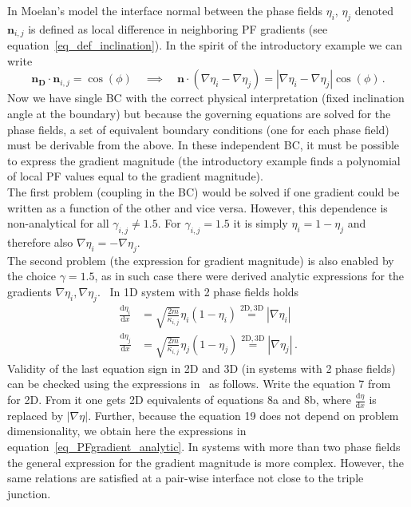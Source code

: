 In Moelan's model the interface normal between the phase fields $\eta_i,\,\eta_j$ denoted $\bm{n}_{i,j}$ is defined as local difference in neighboring PF gradients (see equation~\ref{eq_def_inclination}). In the spirit of the introductory example we can write
\begin{equation}
	\bm{n_D}\cdot\bm{n}_{i,j} = \cos(\phi) \quad \implies \quad \bm{n}\cdot(\nabla\eta_i-\nabla\eta_j) = |\nabla\eta_i-\nabla\eta_j|\cos(\phi) \,.
\end{equation}
Now we have single BC with the correct physical interpretation (fixed inclination angle at the boundary) but because the governing equations are solved for the phase fields, a set of equivalent boundary conditions (one for each phase field) must be derivable from the above. In these independent BC, it must be possible to express the gradient magnitude (the introductory example finds a polynomial of local PF values equal to the gradient magnitude). \\
The first problem (coupling in the BC) would be solved if one gradient could be written as a function of the other and vice versa. However, this dependence is non-analytical for all $\gamma_{i,j}\neq1.5$. For $\gamma_{i,j}=1.5$ it is simply $\eta_i = 1-\eta_j$ and therefore also $\nabla\eta_i=-\nabla\eta_j$.~\cite{Moelans2008} \\
The second problem (the expression for gradient magnitude) is also enabled by the choice $\gamma=1.5$, as in such case there were derived analytic expressions for the gradients $\nabla\eta_i,\nabla\eta_j$.~\cite{Moelans2008} In 1D system with 2 phase fields holds
\begin{equation} \label{eq_PFgradient_analytic}
	\begin{split}
		\frac{\mathrm{d}\eta_i}{\mathrm{d}x} &= \sqrt{\frac{2m}{\kappa_{i,j}}}\eta_i(1-\eta_i) \overset{\mathrm{2D, 3D}}{=} |\nabla\eta_i| \\
		\frac{\mathrm{d}\eta_j}{\mathrm{d}x} &= \sqrt{\frac{2m}{\kappa_{i,j}}}\eta_j(1-\eta_j) \overset{\mathrm{2D, 3D}}{=} |\nabla\eta_j| \,.
	\end{split}
\end{equation}
Validity of the last equation sign in 2D and 3D (in systems with 2 phase fields) can be checked using the expressions in~\cite{Moelans2008} as follows. Write the equation 7 from~\cite{Moelans2008} for 2D. From it one gets 2D equivalents of equations 8a and 8b, where $\frac{\mathrm{d}\eta}{\mathrm{d}x}$ is replaced by $|\nabla\eta|$. Further, because the equation 19 does not depend on problem dimensionality, we obtain here the expressions in equation~\ref{eq_PFgradient_analytic}. In systems with more than two phase fields the general expression for the gradient magnitude is more complex. However, the same relations are satisfied at a pair-wise interface not close to the triple junction. \\
